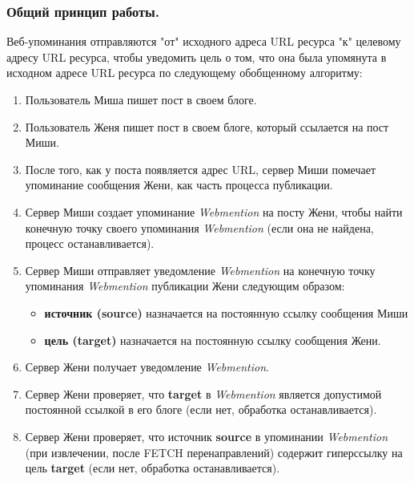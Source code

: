 \hypertarget{ux43eux431ux449ux438ux439-ux43fux440ux438ux43dux446ux438ux43f-ux440ux430ux431ux43eux442ux44b}{%
\subsubsection{Общий принцип
работы.}\label{ux43eux431ux449ux438ux439-ux43fux440ux438ux43dux446ux438ux43f-ux440ux430ux431ux43eux442ux44b}}

Веб-упоминания отправляются "от" исходного адреса URL ресурса "к"
целевому адресу URL ресурса, чтобы уведомить цель о том, что она была
упомянута в исходном адресе URL ресурса по следующему обобщенному
алгоритму:

\begin{enumerate}
\def\labelenumi{\arabic{enumi}.}
\tightlist
\item
  Пользователь Миша пишет пост в своем блоге.
\item
  Пользователь Женя пишет пост в своем блоге, который ссылается на пост
  Миши.
\item
  После того, как у поста появляется адрес URL, сервер Миши помечает
  упоминание сообщения Жени, как часть процесса публикации.
\item
  Сервер Миши создает упоминание \emph{Webmention} на посту Жени, чтобы
  найти конечную точку своего упоминания \emph{Webmention} (если она не
  найдена, процесс останавливается).
\item
  Сервер Миши отправляет уведомление \emph{Webmention} на конечную точку
  упоминания \emph{Webmention} публикации Жени следующим образом:

  \begin{itemize}
  \tightlist
  \item
    \textbf{источник (source)} назначается на постоянную ссылку
    сообщения Миши
  \item
    \textbf{цель (target)} назначается на постоянную ссылку сообщения
    Жени.
  \end{itemize}
\item
  Сервер Жени получает уведомление \emph{Webmention}.
\item
  Сервер Жени проверяет, что \textbf{target} в \emph{Webmention}
  является допустимой постоянной ссылкой в его блоге (если нет,
  обработка останавливается).
\item
  Сервер Жени проверяет, что источник \textbf{source} в упоминании
  \emph{Webmention} (при извлечении, после FETCH перенаправлений)
  содержит гиперссылку на цель \textbf{target} (если нет, обработка
  останавливается).
\end{enumerate}

